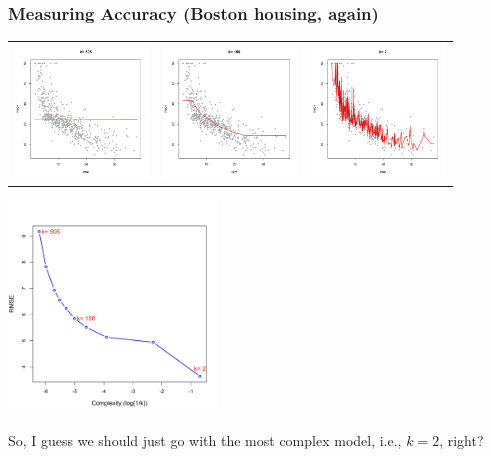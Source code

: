 \documentclass[flegn]{beamer}
\begin{document}
\begin{frame}
\frametitle{Measuring Accuracy (Boston housing, again)}
\vspace{-0.8cm}
\begin{center}
\begin{tabular}{ccc}
\includegraphics[width=1.4in]{k550}&\includegraphics[width=1.4in]{k150}&\includegraphics[width=1.4in]{k2}
\end{tabular}
\end{center}

\vspace{-1.2cm}
\begin{minipage}{2.1in}	
\begin{center}
\includegraphics[width=2.2in]{BostonRMSE-0}
\end{center}
\end{minipage}
\begin{minipage}{2in}	
So, I guess we should just go with the most complex model, i.e., $k=2$, right?
\end{minipage}
\end{frame}
\end{document}

